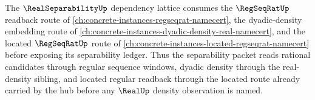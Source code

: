 The $\RealSeparabilityUp$ dependency lattice consumes the $\RegSeqRatUp$ readback route of \autoref{ch:concrete-instances-regseqrat-namecert}, the dyadic-density embedding route of \autoref{ch:concrete-instances-dyadic-density-real-namecert}, and the located $\RegSeqRatUp$ route of \autoref{ch:concrete-instances-located-regseqrat-namecert} before exposing its separability ledger. Thus the separability packet reads rational candidates through regular sequence windows, dyadic density through the real-density sibling, and located regular readback through the located route already carried by the hub before any $\RealUp$ density observation is named.
